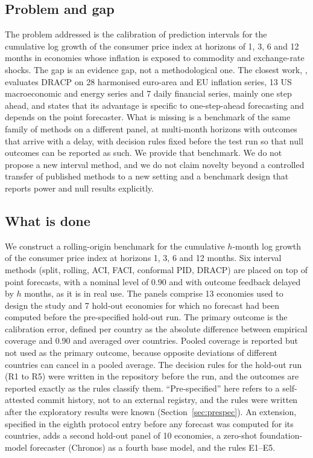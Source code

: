 \subsection{Problem and gap}

The problem addressed is the calibration of prediction intervals for the cumulative log growth of the consumer price index at horizons of 1, 3, 6 and 12 months in economies whose inflation is exposed to commodity and exchange-rate shocks. The gap is an evidence gap, not a methodological one. The closest work, \citet{oancea2026dracp}, evaluates DRACP on 28 harmonised euro-area and EU inflation series, 13 US macroeconomic and energy series and 7 daily financial series, mainly one step ahead, and states that its advantage is specific to one-step-ahead forecasting and depends on the point forecaster. What is missing is a benchmark of the same family of methods on a different panel, at multi-month horizons with outcomes that arrive with a delay, with decision rules fixed before the test run so that null outcomes can be reported as such. We provide that benchmark. We do not propose a new interval method, and we do not claim novelty beyond a controlled transfer of published methods to a new setting and a benchmark design that reports power and null results explicitly.

\subsection{What is done}

We construct a rolling-origin benchmark for the cumulative $h$-month log growth of the consumer price index at horizons 1, 3, 6 and 12 months. Six interval methods (split, rolling, ACI, FACI, conformal PID, DRACP) are placed on top of point forecasts, with a nominal level of 0.90 and with outcome feedback delayed by $h$ months, as it is in real use. The panels comprise 13 economies used to design the study and 7 hold-out economies for which no forecast had been computed before the pre-specified hold-out run. The primary outcome is the calibration error, defined per country as the absolute difference between empirical coverage and 0.90 and averaged over countries. Pooled coverage is reported but not used as the primary outcome, because opposite deviations of different countries can cancel in a pooled average. The decision rules for the hold-out run (R1 to R5) were written in the repository before the run, and the outcomes are reported exactly as the rules classify them. ``Pre-specified'' here refers to a self-attested commit history, not to an external registry, and the rules were written after the exploratory results were known (Section~\ref{sec:prespec}). An extension, specified in the eighth protocol entry before any forecast was computed for its countries, adds a second hold-out panel of 10 economies, a zero-shot foundation-model forecaster (Chronos) as a fourth base model, and the rules E1--E5.

